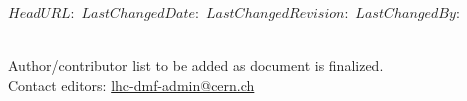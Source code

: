 \svnidlong
{$HeadURL: $}
{$LastChangedDate: $}
{$LastChangedRevision: $}
{$LastChangedBy: $}


\thispagestyle{empty}%
\vspace*{\fill}
\begin{fullwidth}
\sffamily
{
  \Large
  \fontsize{18}{24}\selectfont 
  \@title
}\\
\vspace{4\baselineskip}
{\Large 
\noindent
% 
Author/contributor list to be added as document is finalized.\\
Contact editors: \href{mailto:lhc-dmf-admin@cern.ch}{lhc-dmf-admin@cern.ch}
}\\
\vspace{4\baselineskip}
\noindent
\@date\\
\vspace{\baselineskip}
\end{fullwidth}
\vspace*{\fill}
